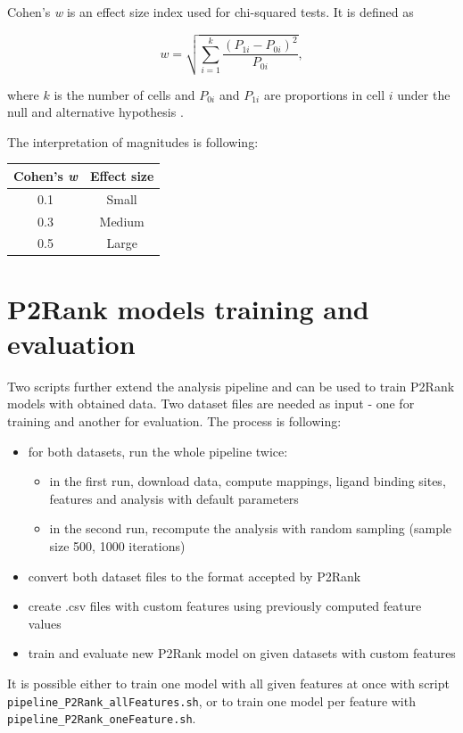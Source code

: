 Cohen's \textit{w} is an effect size index used for chi-squared tests. It is defined as

\begin{equation}
w = \sqrt{\sum\limits_{i=1}^k {\frac{\left( P_{1i}-P_{0i} \right)^2}{P_{0i}}}} ,
\end{equation}

where $k$ is the number of cells and $P_{0i}$ and $P_{1i}$ are proportions in cell $i$ under the null and alternative hypothesis \cite{cohen_book}.

The interpretation of magnitudes is following:

\begin{table}[!h] \centering
\begin{tabular}{cc}
\hline
Cohen's \textit{w} & Effect size \\ \hline
0.1                & Small       \\
0.3                & Medium      \\
0.5                & Large       \\ \hline
\end{tabular}
\end{table}

\section{P2Rank models training and evaluation}

Two scripts further extend the analysis pipeline and can be used to train P2Rank models with obtained data. Two dataset files are needed as input - one for training and another for evaluation. The process is following:

\begin{itemize}
\item for both datasets, run the whole pipeline twice:
	\begin{itemize}
	\item in the first run, download data, compute mappings, ligand binding sites, features and analysis with default parameters
	\item in the second run, recompute the analysis with random sampling (sample size 500, 1000 iterations)
	\end{itemize}
\item convert both dataset files to the format accepted by P2Rank
\item create .csv files with custom features using previously computed feature values
\item train and evaluate new P2Rank model on given datasets with custom features
\end{itemize}

It is possible either to train one model with all given features at once with script \texttt{pipeline\_P2Rank\_allFeatures.sh}, or to train one model per feature with \texttt{pipeline\_P2Rank\_oneFeature.sh}.


